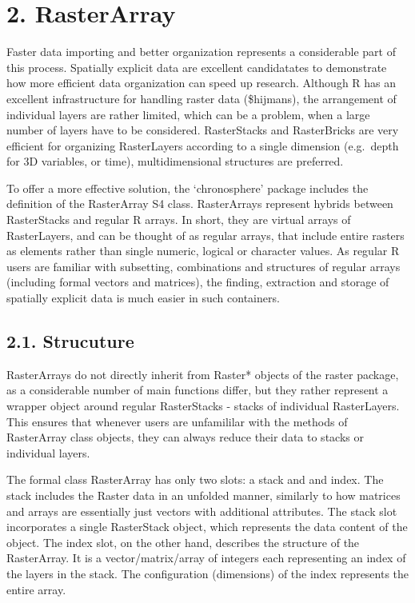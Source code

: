 \documentclass[]{article}
\begin{document}
\hypertarget{rasterarray}{%
\section{2. RasterArray}\label{rasterarray}}

Faster data importing and better organization represents a considerable
part of this process. Spatially explicit data are excellent candidatates
to demonstrate how more efficient data organization can speed up
research. Although R has an excellent infrastructure for handling raster
data (\$hijmans), the arrangement of individual layers are rather
limited, which can be a problem, when a large number of layers have to
be considered. RasterStacks and RasterBricks are very efficient for
organizing RasterLayers according to a single dimension (e.g.~depth for
3D variables, or time), multidimensional structures are preferred.

To offer a more effective solution, the `chronosphere' package includes
the definition of the RasterArray S4 class. RasterArrays represent
hybrids between RasterStacks and regular R arrays. In short, they are
virtual arrays of RasterLayers, and can be thought of as regular arrays,
that include entire rasters as elements rather than single numeric,
logical or character values. As regular R users are familiar with
subsetting, combinations and structures of regular arrays (including
formal vectors and matrices), the finding, extraction and storage of
spatially explicit data is much easier in such containers.

\hypertarget{strucuture}{%
\subsection{2.1. Strucuture}\label{strucuture}}

RasterArrays do not directly inherit from Raster* objects of the raster
package, as a considerable number of main functions differ, but they
rather represent a wrapper object around regular RasterStacks - stacks
of individual RasterLayers. This ensures that whenever users are
unfamililar with the methods of RasterArray class objects, they can
always reduce their data to stacks or individual layers.

The formal class RasterArray has only two slots: a stack and and index.
The stack includes the Raster data in an unfolded manner, similarly to
how matrices and arrays are essentially just vectors with additional
attributes. The stack slot incorporates a single RasterStack object,
which represents the data content of the object. The index slot, on the
other hand, describes the structure of the RasterArray. It is a
vector/matrix/array of integers each representing an index of the layers
in the stack. The configuration (dimensions) of the index represents the
entire array.
\end{document}
